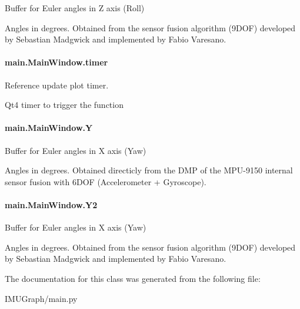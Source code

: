 Buffer for Euler angles in Z axis (Roll) 

Angles in degrees. Obtained from the sensor fusion algorithm (9\-D\-O\-F) developed by Sebastian Madgwick and implemented by Fabio Varesano. \hypertarget{classmain_1_1_main_window_ac830383d366fc669473cc4d94ab64efb}{
\paragraph[{timer}]{\setlength{\rightskip}{0pt plus 5cm}main.\-Main\-Window.\-timer}}\label{classmain_1_1_main_window_ac830383d366fc669473cc4d94ab64efb}


Reference update plot timer. 

Qt4 timer to trigger the  function \hypertarget{classmain_1_1_main_window_a7b804cc35c413c631e3bb870bc123232}{
\paragraph[{Y}]{\setlength{\rightskip}{0pt plus 5cm}main.\-Main\-Window.\-Y}}\label{classmain_1_1_main_window_a7b804cc35c413c631e3bb870bc123232}


Buffer for Euler angles in X axis (Yaw) 

Angles in degrees. Obtained directicly from the D\-M\-P of the M\-P\-U-\/9150 internal sensor fusion with 6\-D\-O\-F (Accelerometer + Gyroscope). \hypertarget{classmain_1_1_main_window_a7a3bc2d61217962905847f0badb89385}{
\paragraph[{Y2}]{\setlength{\rightskip}{0pt plus 5cm}main.\-Main\-Window.\-Y2}}\label{classmain_1_1_main_window_a7a3bc2d61217962905847f0badb89385}


Buffer for Euler angles in X axis (Yaw) 

Angles in degrees. Obtained from the sensor fusion algorithm (9\-D\-O\-F) developed by Sebastian Madgwick and implemented by Fabio Varesano. 

The documentation for this class was generated from the following file\-:\begin{DoxyCompactItemize}
\item 
I\-M\-U\-Graph/main.\-py\end{DoxyCompactItemize}
